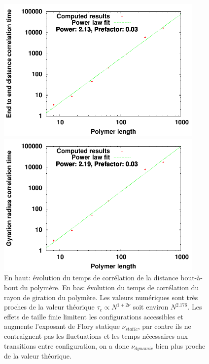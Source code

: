\begin{figure}[H]
\begin{center}
\includegraphics[width=0.9\textwidth]{tpscorrelendtoend.pdf}

\includegraphics[width=0.9\textwidth]{tpscorrelgyr.pdf}

\caption[Résultats numériques: évolution des temps de corrélation]{En haut: évolution du temps de corrélation de la distance bout-à-bout du polymère. En bas: évolution du temps de corrélation du rayon de giration du polymère. Les valeurs numériques sont très proches de la valeur théorique $\tau_c \propto N^{1+2\nu}$ soit environ $N^{2.176}$. Les effets de taille finie limitent les configurations accessibles et augmente l'exposant de Flory statique $\nu_{static}$, par contre ils ne contraignent pas les fluctuations et les temps nécessaires aux transitions entre configuration, on a donc $\nu_{dynamic}$ bien plus proche de la valeur théorique.}
\label{dyntpscorrel}
\end{center}
\end{figure}


